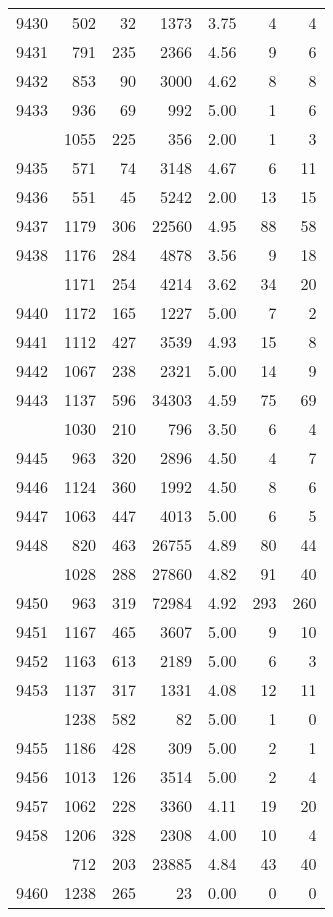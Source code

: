 \documentclass[
]{article}
\begin{document}
\begin{table}
\begin{tabular}[t]{lrrrrrr}
9430 & 502 & 32 & 1373 & 3.75 & 4 & 4\\
9431 & 791 & 235 & 2366 & 4.56 & 9 & 6\\
9432 & 853 & 90 & 3000 & 4.62 & 8 & 8\\
9433 & 936 & 69 & 992 & 5.00 & 1 & 6\\
\addlinespace
9434 & 1055 & 225 & 356 & 2.00 & 1 & 3\\
9435 & 571 & 74 & 3148 & 4.67 & 6 & 11\\
9436 & 551 & 45 & 5242 & 2.00 & 13 & 15\\
9437 & 1179 & 306 & 22560 & 4.95 & 88 & 58\\
9438 & 1176 & 284 & 4878 & 3.56 & 9 & 18\\
\addlinespace
9439 & 1171 & 254 & 4214 & 3.62 & 34 & 20\\
9440 & 1172 & 165 & 1227 & 5.00 & 7 & 2\\
9441 & 1112 & 427 & 3539 & 4.93 & 15 & 8\\
9442 & 1067 & 238 & 2321 & 5.00 & 14 & 9\\
9443 & 1137 & 596 & 34303 & 4.59 & 75 & 69\\
\addlinespace
9444 & 1030 & 210 & 796 & 3.50 & 6 & 4\\
9445 & 963 & 320 & 2896 & 4.50 & 4 & 7\\
9446 & 1124 & 360 & 1992 & 4.50 & 8 & 6\\
9447 & 1063 & 447 & 4013 & 5.00 & 6 & 5\\
9448 & 820 & 463 & 26755 & 4.89 & 80 & 44\\
\addlinespace
9449 & 1028 & 288 & 27860 & 4.82 & 91 & 40\\
9450 & 963 & 319 & 72984 & 4.92 & 293 & 260\\
9451 & 1167 & 465 & 3607 & 5.00 & 9 & 10\\
9452 & 1163 & 613 & 2189 & 5.00 & 6 & 3\\
9453 & 1137 & 317 & 1331 & 4.08 & 12 & 11\\
\addlinespace
9454 & 1238 & 582 & 82 & 5.00 & 1 & 0\\
9455 & 1186 & 428 & 309 & 5.00 & 2 & 1\\
9456 & 1013 & 126 & 3514 & 5.00 & 2 & 4\\
9457 & 1062 & 228 & 3360 & 4.11 & 19 & 20\\
9458 & 1206 & 328 & 2308 & 4.00 & 10 & 4\\
\addlinespace
9459 & 712 & 203 & 23885 & 4.84 & 43 & 40\\
9460 & 1238 & 265 & 23 & 0.00 & 0 & 0\\

\end{tabular}
\end{table}
\end{document}

